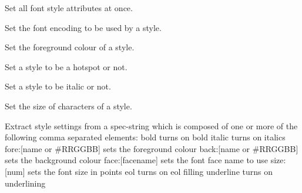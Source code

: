 Set all font style attributes at once.


\label{wxstyledtextctrlstylesetfontencoding}


Set the font encoding to be used by a style.


\label{wxstyledtextctrlstylesetforeground}


Set the foreground colour of a style.


\label{wxstyledtextctrlstylesethotspot}


Set a style to be a hotspot or not.


\label{wxstyledtextctrlstylesetitalic}


Set a style to be italic or not.


\label{wxstyledtextctrlstylesetsize}


Set the size of characters of a style.


\label{wxstyledtextctrlstylesetspec}


Extract style settings from a spec-string which is composed of one or
more of the following comma separated elements:
bold                    turns on bold
italic                  turns on italics
fore:[name or \#RRGGBB]  sets the foreground colour
back:[name or \#RRGGBB]  sets the background colour
face:[facename]         sets the font face name to use
size:[num]              sets the font size in points
eol                     turns on eol filling
underline               turns on underlining


\label{wxstyledtextctrlstylesetunderline}

